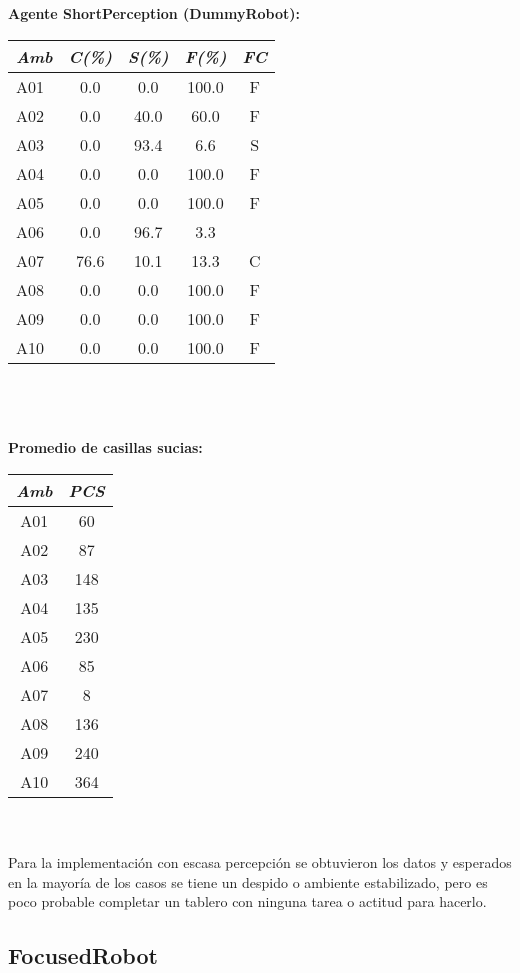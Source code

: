 \documentclass[a4paper,10pt,twocolumn]{article}
\begin{document}
\textbf{Agente ShortPerception     (DummyRobot):}


\begin{tabular}{|l|c|c|c|c|}
	\textit{Amb}  &\textit{C(\%)}& \textit{S(\%)}& \textit{F(\%)}& \textit{FC}  \\ 
	\hline
	A01  &0.0 &0.0 &100.0 &  F\\
	A02  &0.0 &40.0 &60.0 & F\\
	A03  &0.0 &93.4 &6.6 & S\\
	A04  &0.0 &0.0 &100.0 & F\\
	A05  &0.0 &0.0 &100.0 & F\\
	A06  &0.0 &96.7 &3.3 &\\
	A07  &76.6 &10.1 &13.3 & C\\
	A08  &0.0 &0.0 &100.0 & F\\
	A09  &0.0 &0.0 &100.0 & F\\
	A10  &0.0 &0.0 &100.0 & F\\
	
\end{tabular}
\\\\\\
\textbf{Promedio de casillas sucias:}

\begin{tabular}{|c|c|}
	\textit{Amb}  &\textit{PCS}  \\ 
	\hline
	A01  &60 \\
	A02  &87 \\
	A03  &148 \\
	A04  &135 \\
	A05  &230 \\
	A06  &85 \\
	A07  &8 \\
	A08  &136 \\
	A09  &240 \\
	A10  &364 \\
	
\end{tabular}
\\\\

Para la implementaci\'on con escasa percepci\'on se obtuvieron los datos y esperados en la mayor\'ia de los casos se tiene un despido o ambiente estabilizado, pero es poco probable completar un tablero con ninguna tarea o actitud para hacerlo.

\subsection*{FocusedRobot}
\end{document}
